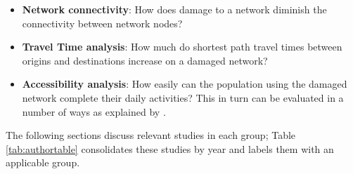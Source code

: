 \begin{itemize}
	\item \textbf{Network connectivity}: How does damage to a network
	diminish the connectivity
between network nodes?
	\item \textbf{Travel Time analysis}: How much do shortest path travel
	times between origins
and destinations increase on a damaged network?
	\item \textbf{Accessibility analysis}: How easily can the population
	using the damaged
network complete their daily activities? This in turn can be evaluated in a number of ways as explained by \citet{dong2006}.
\end{itemize}

The following sections discuss relevant studies in each group; Table
\ref{tab:authortable} consolidates these studies by year and labels them
with
an applicable group.

